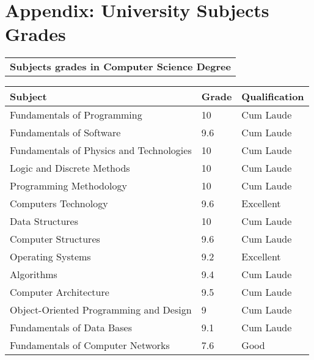 \documentclass[10pt,a4paper,sans]{moderncv} %
\begin{document}

\pagebreak

\section{Appendix: University Subjects Grades}

    \begin{center}
        \begin{tabular}{C{\textwidth}}
        \toprule
    	\textbf{Subjects grades in Computer Science Degree}
        \end{tabular}
    	\kern 2mm
        \begin{tabular}{L{0.5\textwidth}C{0.2\textwidth}C{0.3\textwidth}}
    		\toprule
    		\textbf{Subject} & \textbf{ Grade } & \textbf{ Qualification}     \\
    		\midrule
    		Fundamentals of Programming                   & 10   & Cum Laude  \\
    		Fundamentals of Software                      & 9.6  & Cum Laude  \\
    		Fundamentals of Physics and Technologies      & 10   & Cum Laude  \\
    		Logic and Discrete Methods                    & 10   & Cum Laude  \\
    		Programming Methodology                       & 10   & Cum Laude  \\
    		Computers Technology                          & 9.6  & Excellent   \\
    		Data Structures                               & 10   & Cum Laude  \\
    		Computer Structures                           & 9.6  & Cum Laude  \\
    		Operating Systems                             & 9.2  & Excellent   \\
    		Algorithms                                    & 9.4  & Cum Laude  \\
    		Computer Architecture                         & 9.5  & Cum Laude  \\
    		Object-Oriented Programming and Design        & 9    & Cum Laude  \\
    		Fundamentals of Data Bases                    & 9.1  & Cum Laude  \\
    		Fundamentals of Computer Networks             & 7.6  & Good       \\

\end{tabular}
\end{center}
\end{document}
